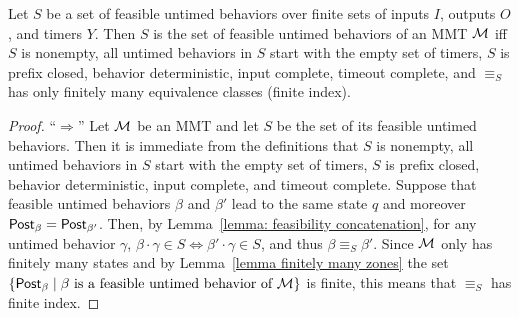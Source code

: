 \begin{theorem}
Let $S$ be a set of feasible untimed behaviors over finite sets of inputs $I$, outputs $O$, and timers $Y$.
Then $S$ is the set of feasible untimed behaviors of an MMT ${\cal M}$ iff $S$ is nonempty, all untimed behaviors in $S$
start with the empty set of timers, $S$ is prefix closed, behavior deterministic, input complete, timeout complete,
and $\equiv_S$ has only finitely many equivalence classes (finite index).
\end{theorem}
\begin{proof}

``$\Rightarrow$'' Let ${\cal M}$ be an MMT and let $S$ be the set of its feasible untimed behaviors.
Then it is immediate from the definitions that $S$ is nonempty, all untimed behaviors in $S$
start with the empty set of timers, $S$ is prefix closed, behavior deterministic, input complete, and timeout complete.
Suppose that feasible untimed behaviors $\beta$ and $\beta'$ lead to the same state $q$ and moreover $\mathsf{Post}_{\beta} = \mathsf{Post}_{\beta'}$.
Then, 
by Lemma~\ref{lemma: feasibility concatenation},
for any untimed behavior $\gamma$, $\beta \cdot \gamma \in S \Leftrightarrow \beta' \cdot \gamma \in S$, and thus
$\beta \equiv_S \beta'$.
Since ${\cal M}$ only has finitely many states and by Lemma~\ref{lemma finitely many zones} the set
$\{ \mathsf{Post}_{\beta} \mid \beta \mbox{ is a feasible untimed behavior of } {\cal M} \}$ is finite, this means that
$\equiv_S$ has finite index.


\end{proof}
